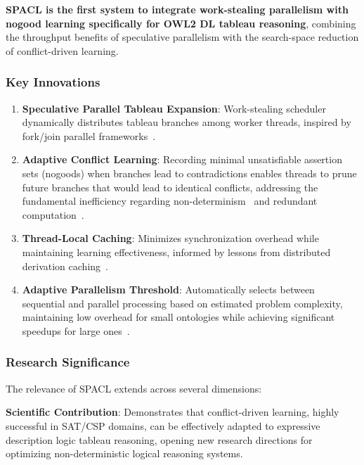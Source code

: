\documentclass[preprint,12pt]{elsarticle}
\begin{document}
\textbf{SPACL is the first system to integrate work-stealing parallelism with nogood learning specifically for OWL2 DL tableau reasoning}, combining the throughput benefits of speculative parallelism with the search-space reduction of conflict-driven learning.

\subsubsection{Key Innovations}

\begin{enumerate}
    \item \textbf{Speculative Parallel Tableau Expansion}: Work-stealing scheduler dynamically distributes tableau branches among worker threads, inspired by fork/join parallel frameworks~\cite{faddoul2015fork,quan2017parallel}.
    
    \item \textbf{Adaptive Conflict Learning}: Recording minimal unsatisfiable assertion sets (nogoods) when branches lead to contradictions enables threads to prune future branches that would lead to identical conflicts, addressing the fundamental inefficiency regarding non-determinism~\cite{faddoul2015fork} and redundant computation~\cite{steigmiller2020parallelised}.
    
    \item \textbf{Thread-Local Caching}: Minimizes synchronization overhead while maintaining learning effectiveness, informed by lessons from distributed derivation caching~\cite{steigmiller2020parallelised}.
    
    \item \textbf{Adaptive Parallelism Threshold}: Automatically selects between sequential and parallel processing based on estimated problem complexity, maintaining low overhead for small ontologies while achieving significant speedups for large ones~\cite{quan2017parallel}.
\end{enumerate}

\subsubsection{Research Significance}

The relevance of SPACL extends across several dimensions:

\textbf{Scientific Contribution}: Demonstrates that conflict-driven learning, highly successful in SAT/CSP domains, can be effectively adapted to expressive description logic tableau reasoning, opening new research directions for optimizing non-deterministic logical reasoning systems.
\end{document}
